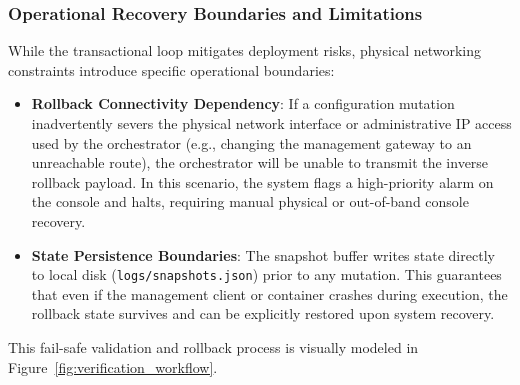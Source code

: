 \subsubsection{Operational Recovery Boundaries and Limitations}
While the transactional loop mitigates deployment risks, physical networking constraints introduce specific operational boundaries:
\begin{itemize}
    \item \textbf{Rollback Connectivity Dependency}: If a configuration mutation inadvertently severs the physical network interface or administrative IP access used by the orchestrator (e.g., changing the management gateway to an unreachable route), the orchestrator will be unable to transmit the inverse rollback payload. In this scenario, the system flags a high-priority alarm on the console and halts, requiring manual physical or out-of-band console recovery.
    \item \textbf{State Persistence Boundaries}: The snapshot buffer writes state directly to local disk (\texttt{logs/snapshots.json}) prior to any mutation. This guarantees that even if the management client or container crashes during execution, the rollback state survives and can be explicitly restored upon system recovery.
\end{itemize}

This fail-safe validation and rollback process is visually modeled in Figure~\ref{fig:verification_workflow}.

